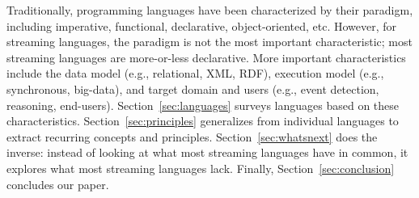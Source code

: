 Traditionally, programming languages have been characterized by their
paradigm, including imperative, functional, declarative,
object-oriented, etc. However, for streaming languages, the paradigm
is not the most important characteristic; most streaming languages are
more-or-less declarative. More important characteristics include the
data model (e.g., relational, XML, RDF), execution model (e.g.,
synchronous, big-data), and target domain and users (e.g., event
detection, reasoning, end-users).  Section~\ref{sec:languages} surveys languages
based on these characteristics. Section~\ref{sec:principles} generalizes from individual languages to
extract recurring concepts and principles. Section~\ref{sec:whatsnext}
does the inverse: instead of looking at what most
streaming languages have in common, it explores what most streaming
languages lack. Finally,
Section~\ref{sec:conclusion} concludes our paper.
